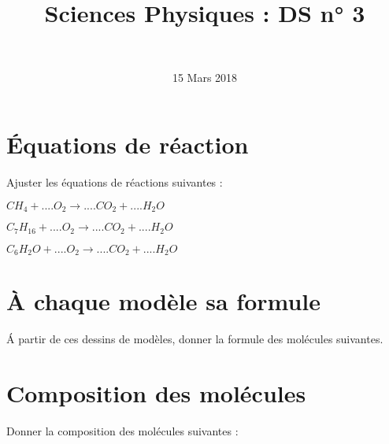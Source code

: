 \documentclass[a4paper,11pt]{exam}
\author{\ }
\date{15 Mars 2018}
\title{Sciences Physiques : DS n° 3}
\begin{document}
%	

	\maketitle
\vspace*{-0.5cm}	
\section{\'Equations de réaction}

Ajuster les équations de réactions suivantes :
\begin{questions}
	\question $CH_4 + ....O_2 \rightarrow ....CO_2 + ....H_2O$
	
	\question $C_7H_{16} + ....O_2 \rightarrow ....CO_2 + ....H_2O$	
	
	\question $C_6H_{2}O + ....O_2 \rightarrow ....CO_2 + ....H_2O$
\end{questions}


\section{À chaque modèle sa formule}
\begin{questions}
	\question \'A partir de ces dessins de modèles, donner la formule des molécules suivantes.

	\fillwithdottedlines{3cm}
	
\end{questions}

\section{Composition des molécules}


\begin{questions}
	\question Donner la composition des molécules suivantes :
	

\end{questions}
\end{document}
